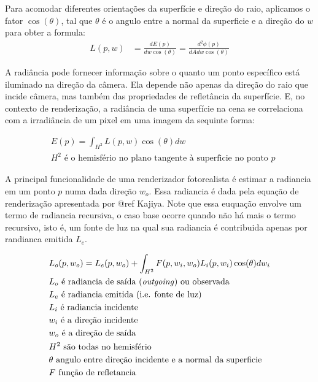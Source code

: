 \documentclass[english, 
               brazil, 
               bsc] %
               {dcomp-abntex2}
\begin{document}
Para acomodar diferentes orientações da superfície e direção do raio, aplicamos o fator $\cos(\theta)$, tal que $\theta$ é o angulo entre a normal da superficie e a direção do $w$ para obter a formula:
\begin{align*} 
  L(p,w) &= \frac{dE(p)}{dw \cos(\theta)} = \frac{d^2\phi(p)}{dAdw \cos(\theta)}
\end{align*}

A radiância pode fornecer informação sobre o quanto um ponto específico está iluminado na direção da câmera. Ela depende não apenas da direção do raio que incide câmera, mas também das propriedades de refletância da superfície. E, no contexto de renderização, a radiância de uma superfície na cena se correlaciona com a irradiância de um pixel em uma imagem da sequinte forma: 

\begin{align*}
  &E(p) = \int_{H^2}{L(p,w)\cos(\theta)dw}\\
  &H^2 \text{ é o hemisfério no plano tangente à superficie no ponto $p$}
\end{align*}


A principal funcionalidade de uma renderizador fotorealista é estimar a radiancia em um ponto $p$ numa dada direção $w_o$. Essa radiancia é dada pela equação de renderização apresentada por @ref Kajiya. Note que essa euquação envolve um termo de radiancia recursiva, o caso base ocorre quando não há mais o termo recursivo, isto é, um fonte de luz na qual sua radiancia é contribuida apenas por randianca emitida $L_e$.

\begin{align*}
  &L_o(p, w_o) = L_e(p, w_o) + 
\int_{H^2}F(p, w_i, w_o){L_i(p,w_i)\cos(\theta)dw_i}\\
    &L_o \text{ é radiancia de saída (\textit{outgoing}) ou {observada}}\\
    &L_e \text{ é radiancia emitida (i.e. fonte de luz)}\\
    &L_i \text{ é radiancia incidente}\\
    &w_i \text{ é a direção incidente}\\
    &w_o \text{ é a direção de saída}\\
    &H^2 \text{ são todas no hemisfério}\\
    &\theta \text{ angulo entre direção incidente e a normal da superficie}\\
    &F \text{ função de refletancia}\\
\end{align*}
\end{document}
